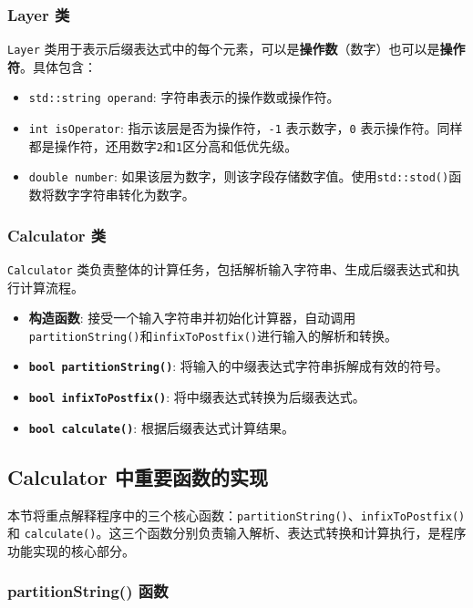 \documentclass[UTF8]{ctexart}
\begin{document}
\subsubsection{Layer 类}

\texttt{Layer} 类用于表示后缀表达式中的每个元素，可以是\textbf{操作数}（数字）也可以是\textbf{操作符}。具体包含：
\begin{itemize}
    \item \texttt{std::string operand}: 字符串表示的操作数或操作符。
    \item \texttt{int isOperator}: 指示该层是否为操作符，\texttt{-1} 表示数字，\texttt{0} 表示操作符。同样都是操作符，还用数字\texttt{2}和\texttt{1}区分高和低优先级。
    \item \texttt{double number}: 如果该层为数字，则该字段存储数字值。使用\texttt{std::stod()}函数将数字字符串转化为数字。
\end{itemize}

\subsubsection{Calculator 类}

\texttt{Calculator} 类负责整体的计算任务，包括解析输入字符串、生成后缀表达式和执行计算流程。

\begin{itemize}
    \item \textbf{构造函数}: 接受一个输入字符串并初始化计算器，自动调用\texttt{partitionString()}和\texttt{infixToPostfix()}进行输入的解析和转换。
    \item \textbf{\texttt{bool partitionString()}}: 将输入的中缀表达式字符串拆解成有效的符号。
    \item \textbf{\texttt{bool infixToPostfix()}}: 将中缀表达式转换为后缀表达式。
    \item \textbf{\texttt{bool calculate()}}: 根据后缀表达式计算结果。
\end{itemize}

\subsection{Calculator 中重要函数的实现}

本节将重点解释程序中的三个核心函数：\texttt{partitionString()}、\texttt{infixToPostfix()} 和 \texttt{calculate()}。这三个函数分别负责输入解析、表达式转换和计算执行，是程序功能实现的核心部分。

\subsubsection{partitionString() 函数}
\end{document}
